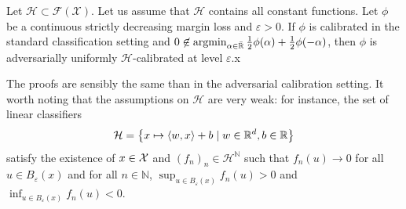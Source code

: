 \begin{prop*}
Let $\mathcal{H}\subset \mathcal{F}(\mathcal{X})$. Let us assume that $\mathcal{H}$ contains all constant functions.
Let $\phi$  be a continuous strictly decreasing margin loss and $\varepsilon>0$. If $\phi$ is calibrated in the standard classification setting and $0\not\in \operatorname*{argmin}_{\alpha\in\bar{\mathbb{R}}}
\frac12\phi(\alpha)+\frac12\phi(-\alpha)$, then $\phi$ is adversarially uniformly $\mathcal{H}$-calibrated at level $\varepsilon$.x


\end{prop*}

The proofs are sensibly the same than in the adversarial calibration setting. It worth noting that the assumptions on $\mathcal{H}$ are very weak: for instance, the set of linear classifiers 
\begin{align*}
    \mathcal{H}=\left\{x\mapsto \langle w,x\rangle +b\mid w\in\RR^d,b\in \RR \right\}
\end{align*}
satisfy the existence of $x\in\mathcal{X}$ and $(f_n)_n\in\mathcal{H}^\mathbb{N}$ such that $f_n(u)\to 0$ for all $ u\in B_\varepsilon(x)$ and for all $n\in\mathbb{N}$, $\sup_{u\in B_\varepsilon(x)} f_n(u)>0$ and  $\inf_{u\in B_\varepsilon(x)} f_n(u)<0$. 